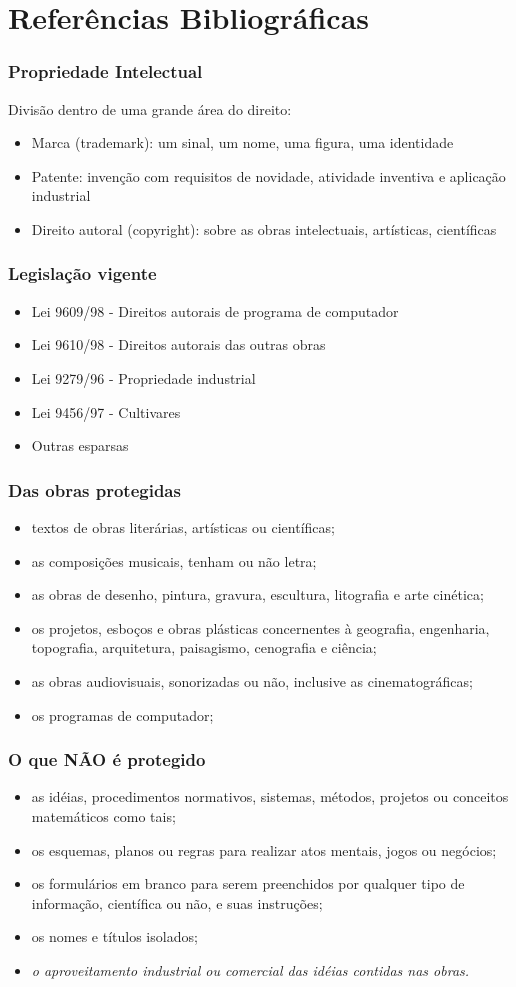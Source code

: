 \documentclass{beamer}
\begin{document}
\section{Referências Bibliográficas}

\frame
{
  \frametitle{Propriedade Intelectual}
  Divisão dentro de uma grande área do direito:
  \begin{itemize}
	\item Marca (trademark): um sinal, um nome, uma figura, uma identidade
	\item Patente: invenção com requisitos de novidade, atividade inventiva e aplicação industrial
 	\item Direito autoral (copyright): sobre as obras intelectuais, artísticas, científicas
  \end{itemize}
}

\frame
{
	\frametitle{Legislação vigente}
	\begin{itemize}
		\item Lei 9609/98 - Direitos autorais de programa de computador
		\item Lei 9610/98 - Direitos autorais das outras obras
		\item Lei 9279/96 - Propriedade industrial
		\item Lei 9456/97 - Cultivares
		\item Outras esparsas
	\end{itemize}

}

\frame
{
	\frametitle{Das obras protegidas}
	\begin{itemize}
		\item textos de obras literárias, artísticas ou científicas;
		\item as composições musicais, tenham ou não letra;
		\item as obras de desenho, pintura, gravura, escultura, litografia e arte cinética;
		\item os projetos, esboços e obras plásticas concernentes à geografia, engenharia, topografia, arquitetura, paisagismo, cenografia e ciência;
		\item as obras audiovisuais, sonorizadas ou não, inclusive as cinematográficas;
		\item os programas de computador;
	\end{itemize}
}

\frame
{
	\frametitle{O que NÃO é protegido}
	\begin{itemize}
		\item as idéias, procedimentos normativos, sistemas, métodos, projetos ou conceitos matemáticos como tais;
		\item os esquemas, planos ou regras para realizar atos mentais, jogos ou negócios;
		\item os formulários em branco para serem preenchidos por qualquer tipo de informação, científica ou não, e suas instruções;
		\item os nomes e títulos isolados;
		\item {\em o aproveitamento industrial ou comercial das idéias contidas nas obras.}
	\end{itemize}
}
\end{document}
